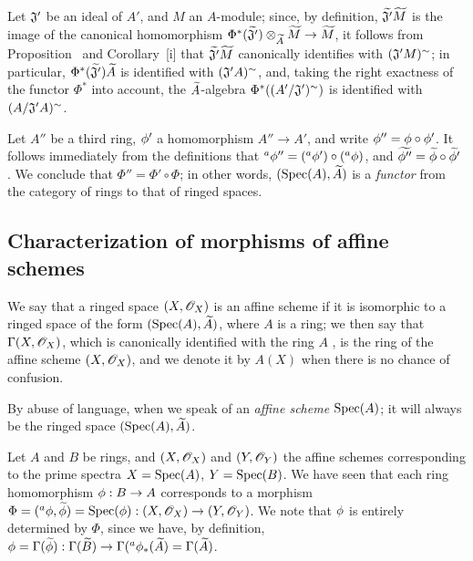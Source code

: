 \begin{env}[1.6.9]
\label{1.1.6.9}
Let $\mathfrak{J}'$ be an ideal of $A'$, and $M$ an $A$-module;
since, by definition, ${\widetilde{\mathfrak{J}'}}{\widetilde{M}}$ is the image of the canonical homomorphism $\Phi^*(\wt{\fk{J}'})\otimes_\wt{A}\wt{M}\to\wt{M}$, it
follows from Proposition~ and Corollary~[i] that
${\widetilde{\mathfrak{J}'}}{\widetilde{M}}$ canonically identifies with $(\mathfrak{J}' M)^\sim$;
in particular, $\Phi^*({\widetilde{\mathfrak{J}'}}){\widetilde{A}}$ is identified with $(\mathfrak{J}' A)^\sim$, and, taking the right exactness of the functor $\Phi^*$ into account,
the ${\widetilde{A}}$-algebra $\Phi^*((A'/\mathfrak{J}')^\sim)$ is identified with $(A/\mathfrak{J}' A)^\sim$.
\end{env}

\begin{env}[1.6.10]
\label{1.1.6.10}
Let $A''$ be a third ring, $\phi'$ a homomorphism $A''\to A'$, and write $\phi''=\phi\circ\phi'$.
It follows immediately from the definitions that ${}^a\phi''=({}^a\phi')\circ({}^a\phi)$, and ${\widetilde{\phi''}}={\widetilde{\phi}}\circ{\widetilde{\phi'}}$ . We conclude that $\Phi''=\Phi'\circ\Phi$;
in other words, $({\mathop{\mathrm{Spec}}\nolimits}(A),{\widetilde{A}})$ is a \emph{functor} from the category of rings to that of ringed spaces.
\end{env}

\subsection{Characterization of morphisms of affine schemes}
\label{subsection-morphisms-affine-schemes}

\begin{defn}[1.7.1]
\label{1.1.7.1}
We say that a ringed space $(X,\mathscr{O}_X)$ is an affine scheme if it is isomorphic to a ringed space of the form $({\mathop{\mathrm{Spec}}\nolimits}(A),{\widetilde{A}})$, where $A$ is a ring;
we then say that $\Gamma(X,\mathscr{O}_X)$, which is canonically identified with the ring $A$ , is the ring of the affine scheme $(X,\mathscr{O}_X)$, and we denote it by $A(X)$ when there is no chance of confusion.
\end{defn}

By abuse of language, when we speak of an \emph{affine scheme ${\mathop{\mathrm{Spec}}\nolimits}(A)$};
it will always be the ringed space $({\mathop{\mathrm{Spec}}\nolimits}(A),{\widetilde{A}})$.

\begin{env}[1.7.2]
\label{1.1.7.2}
Let $A$ and $B$ be rings, and $(X,\mathscr{O}_X)$ and $(Y,\mathscr{O}_Y)$ the affine schemes corresponding to the prime spectra $X={\mathop{\mathrm{Spec}}\nolimits}(A)$, $Y={\mathop{\mathrm{Spec}}\nolimits}(B)$.
We have seen  that each ring homomorphism $\vphi:B\to A$ corresponds to a morphism $\Phi=({}^a\vphi,\wt{\vphi})=\Spec(\vphi):(X,\OO_X)\to(Y,\OO_Y)$.
We note that $\phi$ is entirely determined by $\Phi$, since we have, by definition, $\vphi=\Gamma(\wt{\vphi}):\Gamma(\wt{B})\to\Gamma({}^a\vphi_*(\wt{A})=\Gamma(\wt{A})$.
\end{env}

